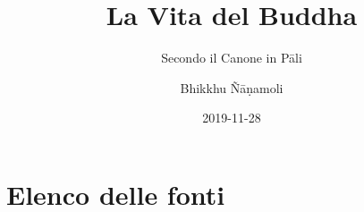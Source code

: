 \documentclass[
  final,
  babelLanguage=italian,
  desktopVersion,
]{anecdote}
\title{La Vita del Buddha}
\subtitle{Secondo il Canone in Pāli}
\author{Bhikkhu Ñāṇamoli}
\date{2019-11-28}
\begin{document}
\frontmatter

\ifdesktopversion
{}
\fi







\cleartorecto
\tableofcontents*

\setlength{\parindent}{18pt}
\setlength{\parskip}{0pt}

\openany








\setlength{\parindent}{0pt}
\setlength{\parskip}{8pt}




\openright

\mainmatter


















\backmatter

\openany

\cleartorecto
\printpagenotes

\chapter{Elenco delle fonti}

\printSource




{%
  \renewcommand\indexname{Indice dei nomi e delle cose notevoli}
  \fontsize{9.5}{15}\selectfont
  \raggedright

  \printindex
}



\emptyUntilModTwo
\end{document}
